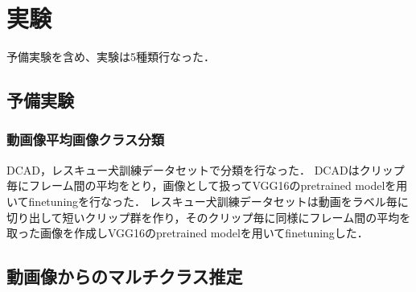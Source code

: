 \chapter{実験}
予備実験を含め、実験は5種類行なった．

\section{予備実験}
\subsection{動画像平均画像クラス分類}
DCAD，レスキュー犬訓練データセットで分類を行なった．
DCADはクリップ毎にフレーム間の平均をとり，画像として扱ってVGG16のpretrained modelを用いてfinetuningを行なった．
レスキュー犬訓練データセットは動画をラベル毎に切り出して短いクリップ群を作り，そのクリップ毎に同様にフレーム間の平均を取った画像を作成しVGG16のpretrained modelを用いてfinetuningした．


\section{動画像からのマルチクラス推定}
